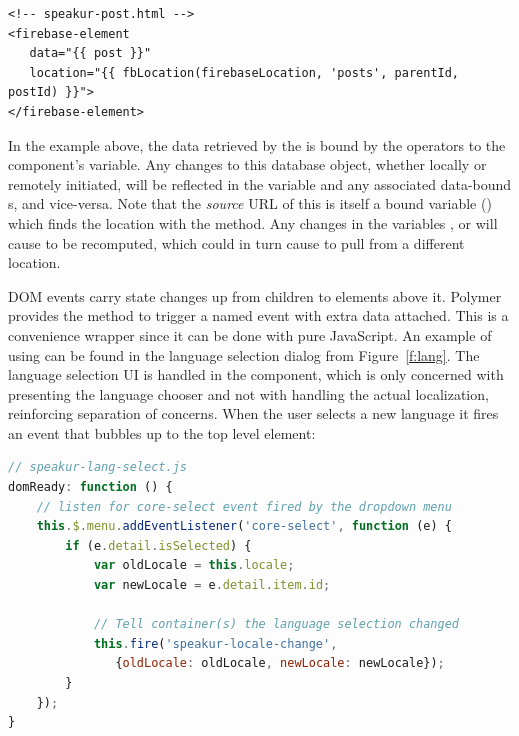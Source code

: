 \begin{lstlisting}[language=HTML5,caption={Binding the \tcode{post} variable to a database record.},label=l:fb_bind,captionpos=below]
<!-- speakur-post.html -->
<firebase-element
   data="{{ post }}"
   location="{{ fbLocation(firebaseLocation, 'posts', parentId, postId) }}">
</firebase-element>
\end{lstlisting}

In the example above, 
the data retrieved by the 
is bound by the \tcode{\{\{ \}\}} operators to the component's  variable. 
Any changes to this database object, 
whether locally or remotely initiated,
will be reflected in the  variable
and any associated data-bound s, 
and vice-versa.
Note that the \textit{source} URL of this  
is itself a \tcode{\{\{ \}\}} bound variable () which finds the location with the  method.
Any changes in the variables ,  or  will cause  to be recomputed,
which could in turn cause  to pull from a different location.

DOM events carry state changes up from children to elements above it.
Polymer provides the  method to trigger a named event with extra data attached.
This is a convenience wrapper since it can be done with pure JavaScript.
An example of using  can be found in the language selection dialog from Figure~\ref{f:lang}.
The language selection UI is handled in the  component,
which is only concerned with presenting the language chooser and not with handling the actual localization,
reinforcing separation of concerns.
When the user selects a new language it fires an event that bubbles up to the top level  element:

\begin{lstlisting}[language=JavaScript,caption={Firing a language change event.},label=l:fire_event,captionpos=below]
// speakur-lang-select.js
domReady: function () {
    // listen for core-select event fired by the dropdown menu
    this.$.menu.addEventListener('core-select', function (e) {
        if (e.detail.isSelected) {
            var oldLocale = this.locale;
            var newLocale = e.detail.item.id;
            
            // Tell container(s) the language selection changed
            this.fire('speakur-locale-change', 
               {oldLocale: oldLocale, newLocale: newLocale});
        }
    });
}
\end{lstlisting}

